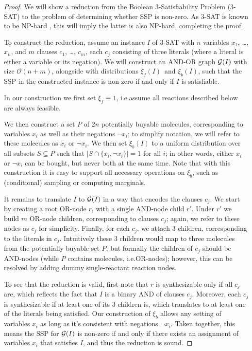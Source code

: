 \begin{proof}
We will show a reduction from the Boolean 3-Satisfiability Problem (3-SAT) to the problem of determining whether SSP is non-zero. As 3-SAT is known to be NP-hard \citep{Karp1972}, this will imply the latter is also NP-hard, completing the proof.

To construct the reduction, assume an instance $I$ of 3-SAT with $n$ variables $x_1$, \ldots, $x_n$, and $m$ clauses $c_1$, \ldots, $c_m$, each $c_j$ consisting of three literals (where a literal is either a variable or its negation).
We will construct an AND-OR graph ${\mathcal{G}}(I)$ with size $\mathcal O(n + m)$, alongside with distributions $\xi_f(I)$~and $\xi_b(I)$,
such that the SSP in the constructed instance is non-zero if and only if $I$ is satisfiable.

In our construction we first set $\xi_f \equiv 1$, i.e.\@ assume all reactions described below are always feasible.

We then construct a set $P$ of $2n$ potentially buyable molecules,
corresponding to variables $x_i$ as well as their negations $\neg x_i$;
to simplify notation, we will refer to these molecules as $x_i$ or $\neg x_i$.
We then set $\xi_b(I)$ to a uniform distribution over all subsets $S \subseteq P$ such that $|S \cap \{x_i, \neg x_i\}| = 1$
for all $i$;
in other words, either $x_i$ or $\neg x_i$ can be bought, but never both at the same time.
Note that with this construction it is easy to support all necessary operations on $\xi_b$, such as (conditional) sampling or computing marginals.

It remains to translate $I$ to ${\mathcal{G}}(I)$ in a way that encodes the clauses $c_j$. 
We start by creating a root OR-node $r$, with a single AND-node child $r'$.
Under $r'$ we build $m$ OR-node children, corresponding to clauses $c_j$; again, we refer to these nodes as $c_j$ for simplicity.
Finally, for each $c_j$, we attach $3$ children, corresponding to the literals in $c_j$.
Intuitively these $3$ children would map to three molecules from the potentially buyable set $P$, but formally the children of $c_j$ should be AND-nodes (while $P$ contains molecules, i.e.\@ OR-nodes); however, this can be resolved by adding dummy single-reactant reaction nodes.

To see that the reduction is valid, first note that $r$ is synthesizable only if all $c_j$ are, which reflects the fact that $I$ is a binary AND of clauses $c_j$. Moreover, each $c_j$ is synthesizable if at least one of its $3$ children is, which translates to at least one of the literals being satisfied. Our construction of $\xi_b$ allows any setting of variables $x_i$ as long as it's consistent with negations $\neg x_i$. Taken together, this means the SSP for ${\mathcal{G}}(I)$ is non-zero if and only if there exists an assignment of variables $x_i$ that satisfies $I$, and thus the reduction is sound.
\end{proof}

